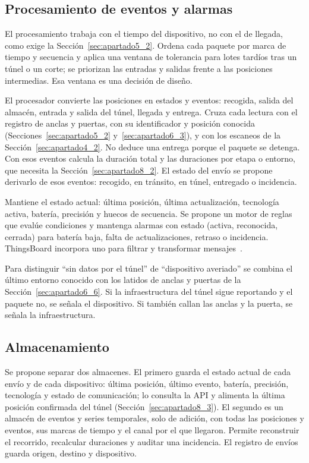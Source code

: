 \documentclass[11pt,a4paper]{article}
\begin{document}
\subsection{Procesamiento de eventos y alarmas}
\label{sec:apartado7_2}

El procesamiento trabaja con el tiempo del dispositivo, no con el de llegada, como exige la Sección~\ref{sec:apartado5_2}. Ordena cada paquete por marca de tiempo y secuencia y aplica una ventana de tolerancia para lotes tardíos tras un túnel o un corte; se priorizan las entradas y salidas frente a las posiciones intermedias. Esa ventana es una decisión de diseño.

El procesador convierte las posiciones en estados y eventos: recogida, salida del almacén, entrada y salida del túnel, llegada y entrega. Cruza cada lectura con el registro de anclas y puertas, con su identificador y posición conocida (Secciones~\ref{sec:apartado5_2} y~\ref{sec:apartado6_3}), y con los escaneos de la Sección~\ref{sec:apartado4_2}. No deduce una entrega porque el paquete se detenga. Con esos eventos calcula la duración total y las duraciones por etapa o entorno, que necesita la Sección~\ref{sec:apartado8_2}. El estado del envío se propone derivarlo de esos eventos: recogido, en tránsito, en túnel, entregado o incidencia.

Mantiene el estado actual: última posición, última actualización, tecnología activa, batería, precisión y huecos de secuencia. Se propone un motor de reglas que evalúe condiciones y mantenga alarmas con estado (activa, reconocida, cerrada) para batería baja, falta de actualizaciones, retraso o incidencia. ThingsBoard incorpora uno para filtrar y transformar mensajes~\cite{ref44}.

Para distinguir ``sin datos por el túnel'' de ``dispositivo averiado'' se combina el último entorno conocido con los latidos de anclas y puertas de la Sección~\ref{sec:apartado6_6}. Si la infraestructura del túnel sigue reportando y el paquete no, se señala el dispositivo. Si también callan las anclas y la puerta, se señala la infraestructura.

\subsection{Almacenamiento}
\label{sec:apartado7_3}

Se propone separar dos almacenes. El primero guarda el estado actual de cada envío y de cada dispositivo: última posición, último evento, batería, precisión, tecnología y estado de comunicación; lo consulta la API y alimenta la última posición confirmada del túnel (Sección~\ref{sec:apartado8_3}). El segundo es un almacén de eventos y series temporales, solo de adición, con todas las posiciones y eventos, sus marcas de tiempo y el canal por el que llegaron. Permite reconstruir el recorrido, recalcular duraciones y auditar una incidencia. El registro de envíos guarda origen, destino y dispositivo.
\end{document}
